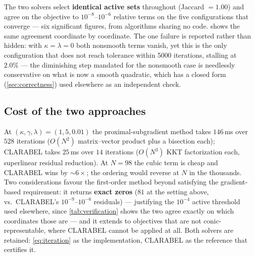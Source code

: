 The two solvers select \textbf{identical active sets} throughout (Jaccard $=1.00$) and agree on
the objective to $10^{-8}$--$10^{-6}$ relative terms on the five configurations that converge ---
six significant figures, from algorithms sharing no code.  shows the same
agreement coordinate by coordinate. The one failure is reported rather than hidden: with
$\kappa=\lambda=0$ both nonsmooth terms vanish, yet this is the only configuration that does not
reach tolerance within 5000 iterations, stalling at $2.0\%$ --- the diminishing step mandated for
the nonsmooth case is needlessly conservative on what is now a smooth quadratic, which has a
closed form (\cref{sec:correctness}) used elsewhere as an independent check.

\subsection{Cost of the two approaches}\label{sec:cost}

At $(\kappa,\gamma,\lambda) = (1,5,0.01)$ the proximal-subgradient method takes $146$\,ms over
$528$ iterations ($O(N^2)$ matrix--vector product plus a bisection each); CLARABEL takes
$25$\,ms over $14$ iterations ($O(N^3)$ KKT factorization each, superlinear residual reduction).
At $N=98$ the cubic term is cheap and CLARABEL wins by $\sim6\times$; the ordering would reverse
at $N$ in the thousands. Two considerations favour the first-order method beyond satisfying the
gradient-based requirement: it returns \textbf{exact zeros} ($81$ at the setting above, vs.\
CLARABEL's $10^{-9}$--$10^{-6}$ residuals) --- justifying the $10^{-4}$ active threshold used
elsewhere, since \cref{tab:verification} shows the two agree exactly on which coordinates those
are --- and it extends to objectives that are not conic-representable, where CLARABEL cannot be
applied at all. Both solvers are retained: \cref{eq:iteration} as the implementation, CLARABEL as
the reference that certifies it.
